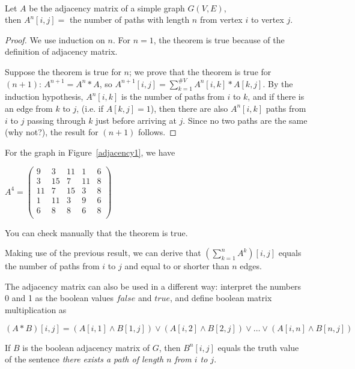  \begin{theorem}
\label{aantalpathen}
$ $ \\
Let $A$ be the adjacency matrix of a simple graph $G(V,E)$,\\
then
$A^{n}[i,j] = $ the number of paths with length $n$ from vertex $i$ to vertex
$j$.
\end{theorem}
\begin{proof} We use induction on $n$. For $n=1$, the theorem is true
because of the definition of adjacency matrix.

Suppose the theorem is true for $n$; we prove that the theorem is true
for $(n+1)$: $A^{n+1}=A^{n}*A$, so $A^{n+1}[i,j] = \sum_{k=1}^{\#V}
A^{n}[i,k]*A[k,j]$. By the induction hypothesis, $A^{n}[i,k]$ is the
number of paths from $i$ to $k$, and if there is an edge from $k$ to
$j$, (i.e. if $A[k,j] = 1$), then there are also $A^{n}[i,k]$ paths
from $i$ to $j$ passing through $k$ just before arriving at
$j$. Since no two paths are the same (why not?), the result for
$(n+1)$ follows.
\end{proof}

For the graph in Figure~\ref{adjacency1}, we have
\begin{center}
$A^{4} = \left(
\begin{array}{ccccc}
9 & 3 & 11& 1 & 6\\
3 & 15& 7 & 11& 8\\
11& 7 & 15& 3 & 8\\
1 & 11& 3 & 9 & 6\\
6 & 8 & 8 & 6 & 8\\
\end{array}
\right)
$
\end{center}

You can check manually that the theorem is true.

Making use of the previous result, we can derive that $(\sum_{k=1}^{n}
A^{k})[i,j]$ equals the number of paths from $i$ to $j$ and equal to
or shorter than $n$ edges.

The adjacency matrix can also be used in a different way: interpret
the numbers 0 and 1 as the boolean values $false$ and $true$, and
define boolean matrix multiplication as

\[(A*B)[i,j] = (A[i,1] \wedge B[1,j]) \vee (A[i,2] \wedge B[2,j]) \vee
\ldots \vee (A[i,n] \wedge B[n,j])\]


If $B$ is the boolean adjacency matrix of $G$, then $B^{n}[i,j]$
equals the truth value of the sentence {\em there exists a path of
length $n$ from $i$ to $j$}.

